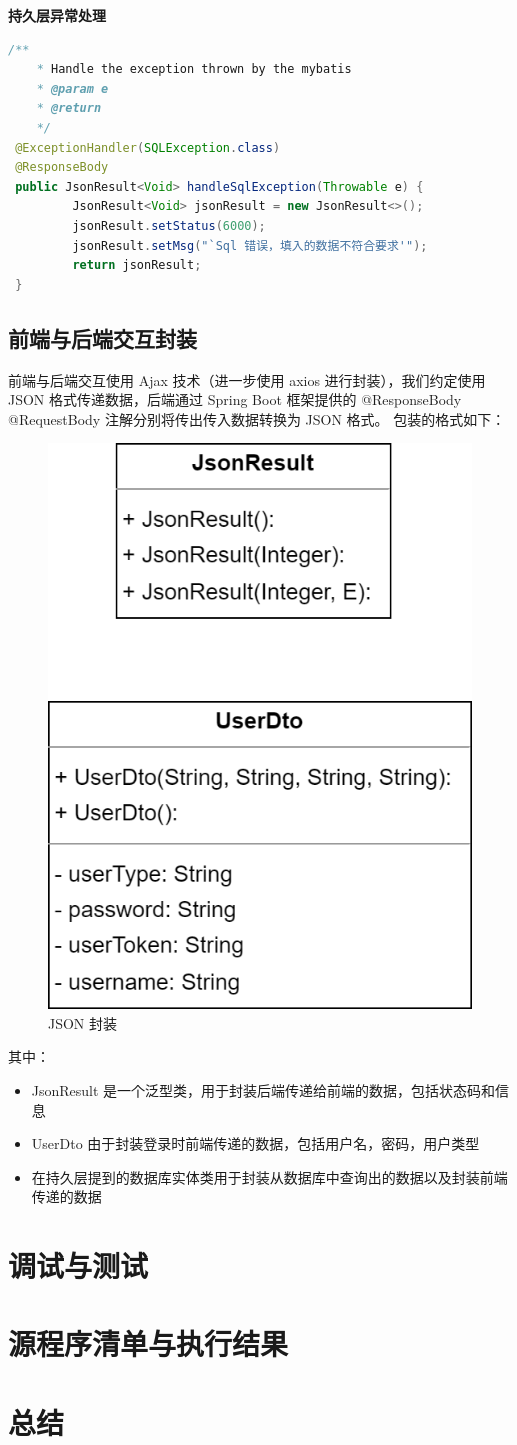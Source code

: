 \documentclass[12pt, a4paper]{article}
\begin{document}
\textbf{持久层异常处理}
\begin{lstlisting}[language=Java]
	/**
	* Handle the exception thrown by the mybatis
	* @param e
	* @return
	*/
 @ExceptionHandler(SQLException.class)
 @ResponseBody
 public JsonResult<Void> handleSqlException(Throwable e) {
		 JsonResult<Void> jsonResult = new JsonResult<>();
		 jsonResult.setStatus(6000);
		 jsonResult.setMsg("`Sql 错误，填入的数据不符合要求'");
		 return jsonResult;
 }
\end{lstlisting}


\subsection{前端与后端交互封装}
前端与后端交互使用 Ajax 技术（进一步使用 axios 进行封装），我们约定使用 JSON 格式传递数据，后端通过 Spring Boot
框架提供的 @ResponseBody @RequestBody 注解分别将传出传入数据转换为 JSON 格式。
包装的格式如下：
\begin{figure}[H]
	\centering
	\includegraphics[width = 0.4 \textwidth]{Json.png}
	\caption{JSON 封装}
\end{figure}
其中：
\begin{itemize}
	\item JsonResult 是一个泛型类，用于封装后端传递给前端的数据，包括状态码和信息
	\item UserDto 由于封装登录时前端传递的数据，包括用户名，密码，用户类型
	\item 在持久层提到的数据库实体类用于封装从数据库中查询出的数据以及封装前端传递的数据
\end{itemize}

\section{调试与测试}

\section{源程序清单与执行结果}

\section{总结}
\end{document}
